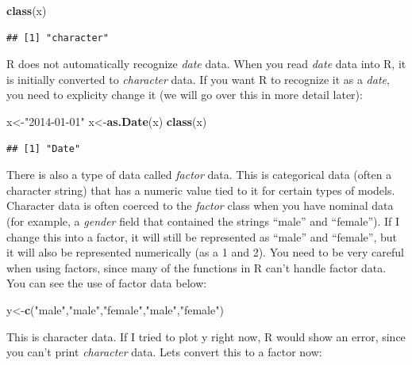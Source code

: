 \documentclass[]{book}
\newenvironment{Shaded}{\begin{snugshade}}{\end{snugshade}}
\newcommand{\KeywordTok}[1]{\textcolor[rgb]{0.13,0.29,0.53}{\textbf{{#1}}}}
\newcommand{\StringTok}[1]{\textcolor[rgb]{0.31,0.60,0.02}{{#1}}}
\newcommand{\NormalTok}[1]{{#1}}
\begin{document}
\begin{Shaded}
\begin{Highlighting}[]
\KeywordTok{class}\NormalTok{(x)}
\end{Highlighting}
\end{Shaded}

\begin{verbatim}
## [1] "character"
\end{verbatim}

R does not automatically recognize \emph{date} data. When you read
\emph{date} data into R, it is initially converted to \emph{character}
data. If you want R to recognize it as a \emph{date}, you need to
explicity change it (we will go over this in more detail later):

\begin{Shaded}
\begin{Highlighting}[]
\NormalTok{x<-}\StringTok{"2014-01-01"}
\NormalTok{x<-}\KeywordTok{as.Date}\NormalTok{(x)}
\KeywordTok{class}\NormalTok{(x)}
\end{Highlighting}
\end{Shaded}

\begin{verbatim}
## [1] "Date"
\end{verbatim}

There is also a type of data called \emph{factor} data. This is
categorical data (often a character string) that has a numeric value
tied to it for certain types of models. Character data is often coerced
to the \emph{factor} class when you have nominal data (for example, a
\emph{gender} field that contained the strings ``male'' and ``female'').
If I change this into a factor, it will still be represented as ``male''
and ``female'', but it will also be represented numerically (as a 1 and
2). You need to be very careful when using factors, since many of the
functions in R can't handle factor data. You can see the use of factor
data below:

\begin{Shaded}
\begin{Highlighting}[]
\NormalTok{y<-}\KeywordTok{c}\NormalTok{(}\StringTok{"male"}\NormalTok{,}\StringTok{"male"}\NormalTok{,}\StringTok{"female"}\NormalTok{,}\StringTok{"male"}\NormalTok{,}\StringTok{"female"}\NormalTok{)}
\end{Highlighting}
\end{Shaded}

This is character data. If I tried to plot y right now, R would show an
error, since you can't print \emph{character} data. Lets convert this to
a factor now:
\end{document}
